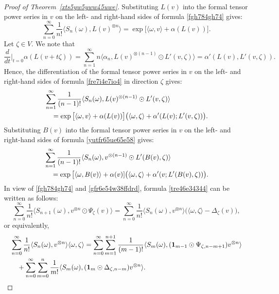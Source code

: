 \documentclass[12pt]{article}
\theoremstyle{remark}
\theoremstyle{remark}
\theoremstyle{remark}
\begin{document}
  \begin{proof}[Proof of Theorem~\ref{xts5yw5yww45uwe}]
 Substituting $L(v)$ into the formal tensor power series in $v$ on the left- and right-hand sides of formula 
 \eqref{fgh784gh74} gives: 
  \begin{equation}\label{fre7i4e7io4}
  \sum_{n=0}^\infty \frac1{n!}\langle S_n(\omega),L(v)^{\otimes n}\rangle=\exp\big[\langle\omega,v\rangle+\alpha(L(v))\big].
  \end{equation}
Let $\zeta\in V$.  We note that
$$\frac{d}{dt}\Big|_{t=0}\alpha(L(v+t\zeta))=\sum_{n=1}^\infty n\langle\alpha_n, L(v)^{\otimes(n-1)}\odot L'(v,\zeta)\rangle=\alpha'(L(v),L'(v,\zeta)). $$
Hence, the differentiation of the formal tensor power series in $v$ on the left- and right-hand sides of formula \eqref{fre7i4e7io4} in direction $\zeta$ gives:
\begin{align}
  &\sum_{n=1}^\infty \frac{1}{(n-1)!}\langle S_n(\omega),L(v)^{\otimes (n-1)}\odot L'(v,\zeta)\rangle\notag\\
  &\quad =\exp\big[\langle\omega,v\rangle+\alpha(L(v))\big]\big(\langle\omega,\zeta\rangle+\alpha'(L(v);L'(v,\zeta))\big).
 \label{yutfr65ue65e58} \end{align}
 Substituting $B(v)$ into the formal tensor power series in $v$ on the left- and right-hand sides of formula 
 \eqref{yutfr65ue65e58} gives: 
\begin{align}
  &\sum_{n=1}^\infty \frac1{(n-1)!}\langle S_n(\omega),v^{\otimes (n-1)}\odot L'(B(v),\zeta)\rangle\notag\\
  &\quad =\exp\big[\langle\omega,B(v)\rangle+\alpha(v)]\big(\langle\omega,\zeta\rangle+\alpha'(v;L'(B(v),\zeta))\big).
 \label{tre46e34344} \end{align}
 In view of \eqref{fgh784gh74} and \eqref{gfr6e54w38ffdrd}, formula \eqref{tre46e34344}  can be written as follows:
 \begin{equation*}
  \sum_{n=0}^\infty \frac1{n!}\langle S_{n+1}(\omega),v^{\otimes n }\odot\Psi_\zeta(v)\rangle
    =\sum_{n=0}^\infty \frac1{n!}\langle S_n(\omega),v^{\otimes n}\rangle  
  \big(\langle\omega,\zeta\rangle-\Delta_{\zeta}(v)\big),
\end{equation*}
or equivalently, 
 \begin{align}
 &\sum_{n=0}^\infty \frac1{n!}\langle S_n(\omega),v^{\otimes n}\rangle\langle\omega,\zeta\rangle
 =\sum_{n=0}^\infty \sum_{m=1}^{n+1}\frac1{(m-1)!}\langle S_m(\omega),(\mathbf 1_{m-1}\odot\Psi_{\zeta,n-m+1})v^{\otimes n}\rangle \notag\\
 &\quad+\sum_{n=0}^\infty \sum_{m=0}^{n}\frac1{m!}\langle S_m(\omega),(\mathbf 1_{m}\odot\Delta_{\zeta,n-m})v^{\otimes n}\rangle.\notag

\end{align}
\end{proof}
\end{document}
